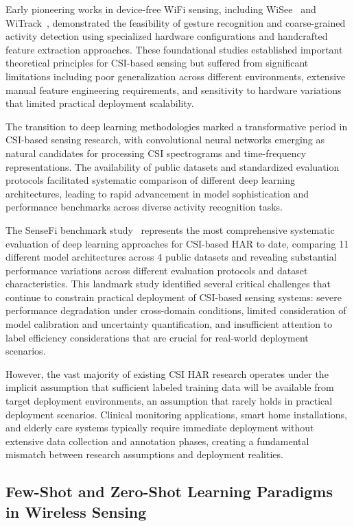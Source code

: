 \documentclass[journal]{IEEEtran}
\begin{document}
Early pioneering works in device-free WiFi sensing, including WiSee~\cite{pu2013whole} and WiTrack~\cite{adib2013see}, demonstrated the feasibility of gesture recognition and coarse-grained activity detection using specialized hardware configurations and handcrafted feature extraction approaches. These foundational studies established important theoretical principles for CSI-based sensing but suffered from significant limitations including poor generalization across different environments, extensive manual feature engineering requirements, and sensitivity to hardware variations that limited practical deployment scalability.

The transition to deep learning methodologies marked a transformative period in CSI-based sensing research, with convolutional neural networks emerging as natural candidates for processing CSI spectrograms and time-frequency representations. The availability of public datasets and standardized evaluation protocols facilitated systematic comparison of different deep learning architectures, leading to rapid advancement in model sophistication and performance benchmarks across diverse activity recognition tasks.

The SenseFi benchmark study~\cite{yang2023sensefi} represents the most comprehensive systematic evaluation of deep learning approaches for CSI-based HAR to date, comparing 11 different model architectures across 4 public datasets and revealing substantial performance variations across different evaluation protocols and dataset characteristics. This landmark study identified several critical challenges that continue to constrain practical deployment of CSI-based sensing systems: severe performance degradation under cross-domain conditions, limited consideration of model calibration and uncertainty quantification, and insufficient attention to label efficiency considerations that are crucial for real-world deployment scenarios.

However, the vast majority of existing CSI HAR research operates under the implicit assumption that sufficient labeled training data will be available from target deployment environments, an assumption that rarely holds in practical deployment scenarios. Clinical monitoring applications, smart home installations, and elderly care systems typically require immediate deployment without extensive data collection and annotation phases, creating a fundamental mismatch between research assumptions and deployment realities.

\subsection{Few-Shot and Zero-Shot Learning Paradigms in Wireless Sensing}
\end{document}

